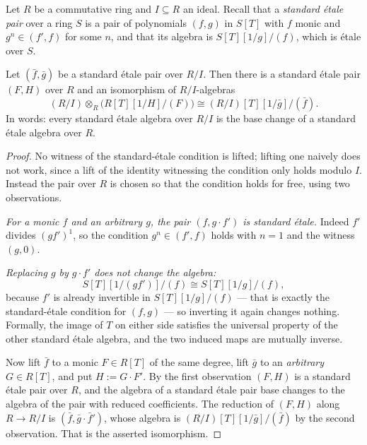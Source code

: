 \begin{lemma}
\label{lemma:openclosed-standard-etale-lift}
\leanok
Let $R$ be a commutative ring and $I\subseteq R$ an ideal.  Recall that a
\emph{standard \'etale pair} over a ring $S$ is a pair of polynomials
$(f,g)$ in $S[T]$ with $f$ monic and $g^n\in(f',f)$ for some $n$, and that
its algebra is $S[T][1/g]/(f)$, which is \'etale over $S$.

Let $(\bar f,\bar g)$ be a standard \'etale pair over $R/I$.  Then there is a
standard \'etale pair $(F,H)$ over $R$ and an isomorphism of $R/I$-algebras
\[
  (R/I)\otimes_R\bigl(R[T][1/H]/(F)\bigr)
  \cong(R/I)[T][1/\bar g]/(\bar f).
\]
In words: every standard \'etale algebra over $R/I$ is the base change of a
standard \'etale algebra over $R$.
\end{lemma}
\begin{proof}
\leanok
No witness of the standard-\'etale condition is lifted; lifting one naively
does not work, since a lift of the identity witnessing the condition only
holds modulo $I$.  Instead the pair over $R$ is chosen so that the condition
holds for free, using two observations.

\emph{For a monic $f$ and an arbitrary $g$, the pair $(f,g\cdot f')$ is
standard \'etale.}  Indeed $f'$ divides $(g f')^1$, so the condition
$g^n\in(f',f)$ holds with $n=1$ and the witness $(g,0)$.

\emph{Replacing $g$ by $g\cdot f'$ does not change the algebra:}
\[
  S[T][1/(g f')]/(f)\cong S[T][1/g]/(f),
\]
because $f'$ is already invertible in $S[T][1/g]/(f)$ --- that is exactly the
standard-\'etale condition for $(f,g)$ --- so inverting it again changes
nothing.  Formally, the image of $T$ on either side satisfies the universal
property of the other standard \'etale algebra, and the two induced maps are
mutually inverse.

Now lift $\bar f$ to a monic $F\in R[T]$ of the same degree, lift $\bar g$ to
an \emph{arbitrary} $G\in R[T]$, and put $H:=G\cdot F'$.  By the first
observation $(F,H)$ is a standard \'etale pair over $R$, and the algebra of a
standard \'etale pair base changes to the algebra of the pair with reduced
coefficients.  The reduction of $(F,H)$ along $R\to R/I$ is
$(\bar f,\bar g\cdot\bar f')$, whose algebra is $(R/I)[T][1/\bar g]/(\bar f)$
by the second observation.  That is the asserted isomorphism.
\end{proof}

